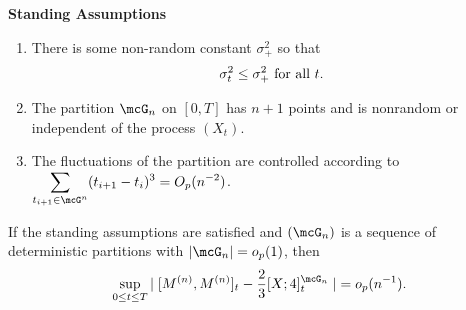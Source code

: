 \documentclass{report}
\begin{document}
\vspace{10pt} \noindent \textbf{Standing Assumptions}
\begin{enumerate}
\item There is some non-random constant $\sigma_+^2$ so that
\[
\sigma_t^2 \leq \sigma_+^2 \textmd{ for all } t.
\]
\item The partition $\mcG_n$ on $[0,T]$ has $n+1$ points and is
nonrandom or independent of the process $(X_t)$.
\item The fluctuations of the partition are controlled according to
$\displaystyle \sum_{t_{i+1} \in \mcG^n} (t_{i+1} - t_i)^3 =
O_p(n^{-2})$.
\end{enumerate}

\begin{proposition}
If the standing assumptions are satisfied and $(\mcG_n)$ is a sequence
of deterministic partitions with $|\mcG_n| = o_p(1)$, then
\[
\sup_{0 \leq t \leq T} | \; [M^{(n)},M^{(n)}]_t - \frac{2}{3}
[X;4]^{\mcG_n}_t \; | = o_p(n^{-1}).
\]
\end{proposition}
\end{document}
